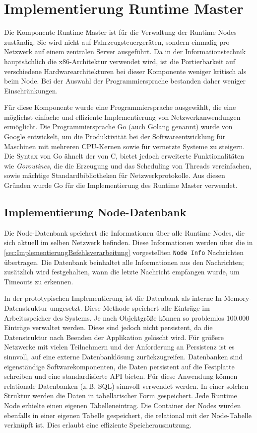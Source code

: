 \section{Implementierung Runtime Master}
\label{sec:ImplementierungRuntimeMaster}

Die Komponente Runtime Master ist für die Verwaltung der Runtime Nodes zuständig. Sie wird nicht auf Fahrzeugsteuergeräten, sondern einmalig pro Netzwerk auf einem zentralen Server ausgeführt. Da in der Informationstechnik hauptsächlich die x86-Architektur verwendet wird, ist die Portierbarkeit auf verschiedene Hardwarearchitekturen bei dieser Komponente weniger kritisch als beim Node. Bei der Auswahl der Programmiersprache bestanden daher weniger Einschränkungen. 

Für diese Komponente wurde eine Programmiersprache ausgewählt, die eine möglichst einfache und effiziente Implementierung von Netzwerkanwendungen ermöglicht. Die Programmiersprache Go (auch Golang genannt) wurde von Google entwickelt, um die Produktivität bei der Softwareentwicklung für Maschinen mit mehreren CPU-Kernen sowie für vernetzte Systeme zu steigern. Die Syntax von Go ähnelt der von C, bietet jedoch erweiterte Funktionalitäten wie \textit{Goroutines}, die die Erzeugung und das Scheduling von Threads vereinfachen, sowie mächtige Standardbibliotheken für Netzwerkprotokolle. Aus diesen Gründen wurde Go für die Implementierung des Runtime Master verwendet.

\subsection{Implementierung Node-Datenbank}
Die Node-Datenbank speichert die Informationen über alle Runtime Nodes, die sich aktuell im selben Netzwerk befinden. Diese Informationen werden über die in \autoref{sec:ImplementierungBefehlsverarbeitung} vorgestellten \texttt{Node Info} Nachrichten übertragen. Die Datenbank beinhaltet alle Informationen aus den Nachrichten; zusätzlich wird festgehalten, wann die letzte Nachricht empfangen wurde, um Timeouts zu erkennen. 

In der prototypischen Implementierung ist die Datenbank als interne In-Memory-Datenstruktur umgesetzt. Diese Methode speichert alle Einträge im Arbeitsspeicher des Systems. Je nach Objektgröße können so problemlos 100.000 Einträge verwaltet werden. Diese sind jedoch nicht persistent, da die Datenstruktur nach Beenden der Applikation gelöscht wird. Für größere Netzwerke mit vielen Teilnehmern und der Anforderung an Persistenz ist es sinnvoll, auf eine externe Datenbanklösung zurückzugreifen. Datenbanken sind eigenständige Softwarekomponenten, die Daten persistent auf die Festplatte schreiben und eine standardisierte API bieten. Für diese Anwendung können relationale Datenbanken (z.\,B. SQL) sinnvoll verwendet werden. In einer solchen Struktur werden die Daten in tabellarischer Form gespeichert. Jede Runtime Node erhielte einen eigenen Tabelleneintrag. Die Container der Nodes würden ebenfalls in einer eigenen Tabelle gespeichert, die relational mit der Node-Tabelle verknüpft ist. Dies erlaubt eine effiziente Speicherausnutzung.

